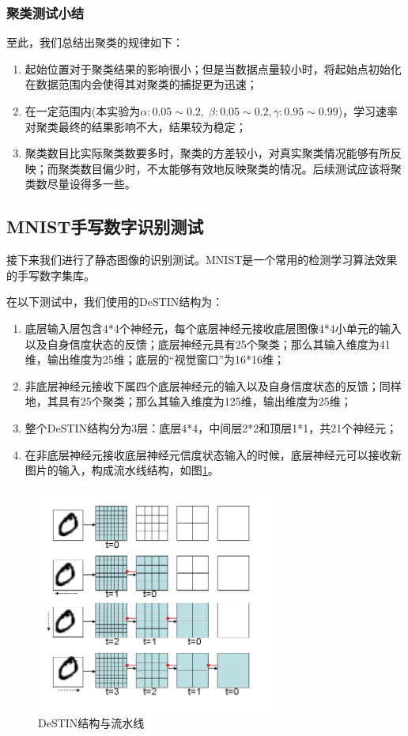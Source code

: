 \subsubsection{聚类测试小结}
至此，我们总结出聚类的规律如下：
\begin{enumerate}
\item 起始位置对于聚类结果的影响很小；但是当数据点量较小时，将起始点初始化在数据范围内会使得其对聚类的捕捉更为迅速；
\item 在一定范围内(本实验为$\alpha:0.05\sim 0.2,\;\beta:0.05\sim 0.2, \gamma: 0.95\sim 0.99$)，学习速率对聚类最终的结果影响不大，结果较为稳定；
\item 聚类数目比实际聚类数要多时，聚类的方差较小，对真实聚类情况能够有所反映；而聚类数目偏少时，不太能够有效地反映聚类的情况。后续测试应该将聚类数尽量设得多一些。
\end{enumerate}


\subsection{MNIST手写数字识别测试}
接下来我们进行了静态图像的识别测试。MNIST是一个常用的检测学习算法效果的手写数字集库。

在以下测试中，我们使用的DeSTIN结构为：
\begin{enumerate}
\item 底层输入层包含4*4个神经元，每个底层神经元接收底层图像4*4小单元的输入以及自身信度状态的反馈；底层神经元具有25个聚类；那么其输入维度为41维，输出维度为25维；底层的“视觉窗口”为16*16维；
\item 非底层神经元接收下属四个底层神经元的输入以及自身信度状态的反馈；同样地，其具有25个聚类；那么其输入维度为125维，输出维度为25维；
\item 整个DeSTIN结构分为3层：底层4*4，中间层2*2和顶层1*1，共21个神经元；
\item 在非底层神经元接收底层神经元信度状态输入的时候，底层神经元可以接收新图片的输入，构成流水线结构，如图\ref{fig:pipeline}。
\end{enumerate}

\begin{figure}[htbp]
   \centering
   \includegraphics[width=0.7\textwidth]{ScanningPipeline.png} %
   \caption{DeSTIN结构与流水线}
   \label{fig:pipeline}
\end{figure}


